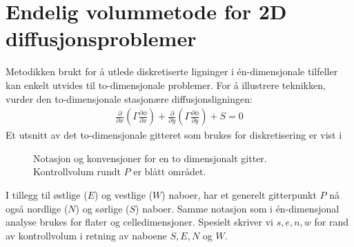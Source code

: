 \section{Endelig volummetode for 2D diffusjonsproblemer}\label{EVM2D}
Metodikken brukt for å utlede diskretiserte ligninger i én-dimensjonale tilfeller kan enkelt utvides til to-dimensjonale problemer. For å illustrere teknikken, vurder den to-dimensjonale stasjonære diffusjonsligningen:
\begin{align}\label{EV:2Dligning}
\frac{\partial}{\partial x} \left( \Gamma \frac{\partial \phi}{\partial x} \right) + \frac{\partial}{\partial y} \left( \Gamma \frac{\partial \phi}{\partial y} \right) + S = 0
\end{align}
Et utsnitt av det to-dimensjonale gitteret som brukes for diskretisering er vist i 
\begin{figure}[ht]\centering
{}
\caption{Notasjon og konvensjoner for en to dimensjonalt gitter. Kontrollvolum rundt $P$ er blått området.}\label{2Dgrid}
\end{figure}
I tillegg til østlige ($E$) og vestlige ($W$) naboer, har et generelt gitterpunkt $P$ nå også nordlige ($N$) og sørlige ($S$) naboer. Samme notasjon som i én-dimensjonal analyse brukes for flater og celledimensjoner. Spesielt skriver vi $s,e,n,w$ for rand av kontrollvolum i retning av naboene $S,E,N$ og $W$.


